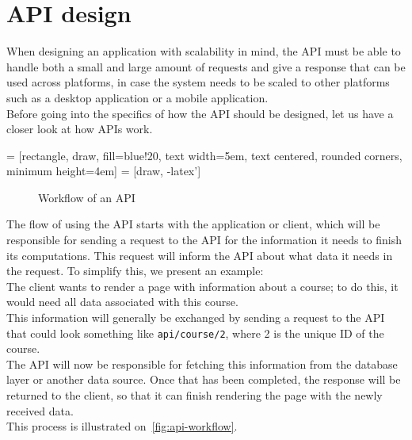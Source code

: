 \section{API design}
When designing an application with scalability in mind, the API must be able to handle both a small and large amount of requests and give a response that can be used across platforms, in case the system needs to be scaled to other platforms such as a desktop application or a mobile application.\\
Before going into the specifics of how the API should be designed, let us have a closer look at how APIs work.

 = [rectangle, draw, fill=blue!20,
    text width=5em, text centered, rounded corners, minimum height=4em]
 = [draw, -latex']

\begin{figure}
\centering
{}
\caption{Workflow of an API} \label{fig:api-workflow}
\end{figure}

The flow of using the API starts with the application or client, which will be responsible for sending a request to the API for the information it needs to finish its computations.
This request will inform the API about what data it needs in the request.
To simplify this, we present an example:\\
The client wants to render a page with information about a course; to do this, it would need all data associated with this course.\\
This information will generally be exchanged by sending a request to the API that could look something like \texttt{api/course/2}, where 2 is the unique ID of the course.
\\
The API will now be responsible for fetching this information from the database layer or another data source. Once that has been completed, the response will be returned to the client, so that it can finish rendering the page with the newly received data.
\\
This process is illustrated on~\autoref{fig:api-workflow}.

